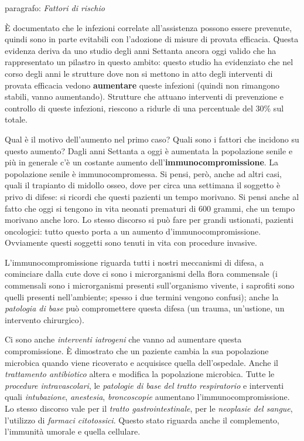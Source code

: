 \documentclass[]{article}
\begin{document}
paragrafo: \emph{Fattori di rischio}

È documentato che le infezioni correlate all'assistenza possono essere
prevenute, quindi sono in parte evitabili con l'adozione di misure di
provata efficacia. Questa evidenza deriva da uno studio degli anni
Settanta ancora oggi valido che ha rappresentato un pilastro in questo
ambito: questo studio ha evidenziato che nel corso degli anni le
strutture dove non si mettono in atto degli interventi di provata
efficacia vedono \textbf{aumentare} queste infezioni (quindi non
rimangono stabili, vanno aumentando). Strutture che attuano interventi
di prevenzione e controllo di queste infezioni, riescono a ridurle di
una percentuale del 30\% sul totale.

Qual è il motivo dell'aumento nel primo caso? Quali sono i fattori che
incidono su questo aumento? Dagli anni Settanta a oggi è aumentata la
popolazione senile e più in generale c'è un costante aumento
dell'\textbf{immunocompromissione}. La popolazione senile è
immunocompromessa. Si pensi, però, anche ad altri casi, quali il
trapianto di midollo osseo, dove per circa una settimana il soggetto è
privo di difese: si ricordi che questi pazienti un tempo morivano. Si
pensi anche al fatto che oggi si tengono in vita neonati prematuri di
600 grammi, che un tempo morivano anche loro. Lo stesso discorso si può
fare per grandi ustionati, pazienti oncologici: tutto questo porta a un
aumento d'immunocompromissione. Ovviamente questi soggetti sono tenuti
in vita con procedure invasive.

L'immunocompromissione riguarda tutti i nostri meccanismi di difesa, a
cominciare dalla cute dove ci sono i microrganismi della flora
commensale (i commensali sono i microrganismi presenti sull'organismo
vivente, i saprofiti sono quelli presenti nell'ambiente; spesso i due
termini vengono confusi); anche la \emph{patologia di base} può
compromettere questa difesa (un trauma, un'ustione, un intervento
chirurgico).

Ci sono anche \emph{interventi iatrogeni} che vanno ad aumentare questa
compromissione. È dimostrato che un paziente cambia la sua popolazione
microbica quando viene ricoverato e acquisisce quella dell'ospedale.
Anche il \emph{trattamento antibiotico} altera e modifica la popolazione
microbica. Tutte le \emph{procedure intravascolari}, le \emph{patologie
di base del tratto respiratorio} e interventi quali \emph{intubazione},
\emph{anestesia}, \emph{broncoscopie} aumentano l'immunocompromissione.
Lo stesso discorso vale per il \emph{tratto gastrointestinale}, per le
\emph{neoplasie del sangue}, l'utilizzo di \emph{farmaci citotossici}.
Questo stato riguarda anche il complemento, l'immunità umorale e quella
cellulare.
\end{document}
